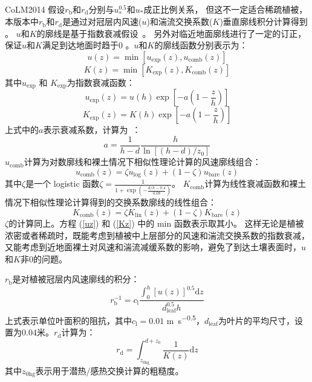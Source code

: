 CoLM2014 假设$r_{\mathrm {b}}$和$r_{\mathrm {d}}$分别与$u_\ast^{0.5}$和$u_\ast$成正比例关系，
但这不一定适合稀疏植被，本版本中$r_{\mathrm {b}}$和$r_{\mathrm {d}}$是通过对冠层内风速($u$)和湍流交换系数($K$)垂直廓线积分计算得到 \citep{dai2019different}。
$u$和$K$的廓线是基于指数衰减假设~\citep{inoue1963turbulent,cowan1968mass}。
另外对临近地面廓线进行了一定的订正，保证$u$和$K$满足到达地面时趋于0 \citep{dai2019different}。$u$和$K$的廓线函数分别表示为：
\begin{equation}\label{uz}
  u(z)=\min \left[u_{\mathrm{exp}}(z), u_{\mathrm{comb}}(z)\right]
\end{equation}
\begin{equation}\label{Kz}
  K(z)=\min \left[K_{\mathrm{exp}}(z), K_{\mathrm{comb}}(z)\right]
\end{equation}
其中$u_{\mathrm{exp}}$ 和 $K_{\mathrm{exp}}$为指数衰减函数：
\begin{equation}
  u_{\mathrm{exp}}(z)=u(h) \exp \left[-a\left(1-\frac{z}{h}\right)\right]
\end{equation}
\begin{equation}
  K_{\mathrm{exp}}(z)=K(h) \exp \left[-a\left(1-\frac{z}{h}\right)\right]
\end{equation}
上式中的$a$表示衰减系数，计算为~\citep{inoue1963turbulent,cowan1968mass,kondo1971relationship}：
\begin{equation}
  a=\frac{1}{h-d} \frac{h}{\ln \left[(h-d) / z_{0}\right]}
\end{equation}
$u_{\mathrm{comb}}$计算为对数廓线和裸土情况下相似性理论计算的风速廓线组合：
\begin{equation}\label{ucomb}
  u_{\mathrm{comb}}(z)=\zeta u_{\mathrm{\log }}(z)+(1-\zeta) u_{\mathrm{{bare }}}(z)
\end{equation}
其中$\zeta$是一个 logistic 函数$\zeta=\frac{1}{1+\exp{\left(-\frac{d/h-0.4}{0.08}\right)}}$。
$K_{\mathrm{comb}}$计算为线性衰减函数和裸土情况下相似性理论计算得到的交换系数廓线的线性组合：
\begin{equation}\label{kcomb}
  K_{\mathrm{comb}}(z)=\zeta K_{\mathrm{\mathrm{lin}}}(z)+(1-\zeta) K_{\mathrm{bare}}(z)
\end{equation}
$\zeta$的计算同上。方程 (\ref{uz}) 和 (\ref{Kz}) 中的 min 函数表示取其小。
这样无论是植被浓密或者稀疏时，既能考虑到植被中上层部分的风速和湍流交换系数的指数衰减，
又能考虑到近地面裸土对风速和湍流减缓系数的影响，避免了到达土壤表面时，$u$和$K$非0的问题。


$r_{\mathrm {b}}$是对植被冠层内风速廓线的积分：
\begin{equation}
  r_{\mathrm{b}}^{-1}=c_{\mathrm{l}} \frac{\int_{0}^{h}[u(z)]^{0.5} {\mathrm d} z}{d_{\mathrm{leaf}}^{0.5} h}
\end{equation}
上式表示单位叶面积的阻抗，其中$c_{\mathrm {l}}=0.01$ \unit{m.s^{-0.5}}，$d_{\mathrm{leaf}}$为叶片的平均尺寸，设置为0.04米。$r_{\mathrm {d}}$计算为：
\begin{equation}\label{r_d1}
  r_{\mathrm{d}}=\int_{z_{0 \mathrm{hg}}}^{d+z_{0}} \frac{1}{K(z)} {\mathrm d} z
\end{equation}
其中$z_{\mathrm{0hg}}$表示用于潜热/感热交换计算的粗糙度\citep{zeng1998effect}。

